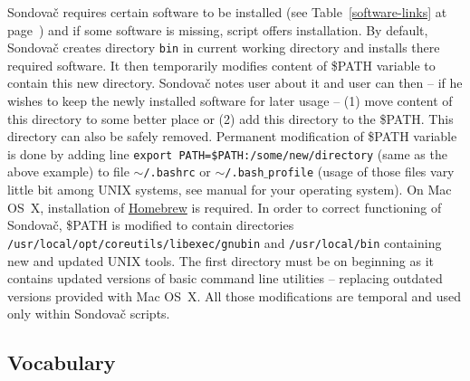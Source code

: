\documentclass[a4paper, 11pt, twoside]{article}
\begin{document}
Sondovač requires certain software to be installed (see Table~\ref{software-links} at page~\pageref{software-links}) and if some software is missing, script offers installation. By default, Sondovač creates directory \texttt{bin} in current working directory and installs there required software. It then temporarily modifies content of \$PATH variable to contain this new directory. Sondovač notes user about it and user can then -- if he wishes to keep the newly installed software for later usage -- (1) move content of this directory to some better place or (2) add this directory to the \$PATH. This directory can also be safely removed. Permanent modification of \$PATH variable is done by adding line \texttt{export PATH=\$PATH:/some/new/directory} (same as the above example) to file \texttt{$\sim$/.bashrc} or \texttt{$\sim$/.bash$\_$profile} (usage of those files vary little bit among UNIX systems, see manual for your operating system). On Mac OS~X, installation of \href{http://brew.sh/}{Homebrew} is required. In order to correct functioning of Sondovač, \$PATH is modified to contain directories \texttt{/usr/local/opt/coreutils/libexec/gnubin} and \texttt{/usr/local/bin} containing new and updated UNIX tools. The first directory must be on beginning as it contains updated versions of basic command line utilities -- replacing outdated versions provided with Mac OS~X. All those modifications are temporal and used only within Sondovač scripts.

\subsection{Vocabulary}
\label{vocabulary}
\end{document}
